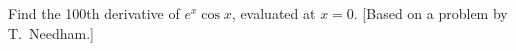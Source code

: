 Find the 100th derivative of $e^x\cos x$, evaluated at $x=0$.
[Based on a problem by T.~Needham.]\answercheck
